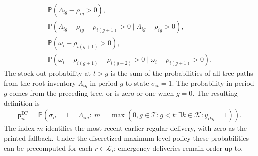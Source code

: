\documentclass[10pt]{article}
\begin{document}
\begin{gather*}
\mathbb P(\Lambda_{ig}-\rho_{ig}>0),\\
\mathbb P(\Lambda_{ig}-\rho_{ig}-\rho_{i(g+1)}>0\mid\Lambda_{ig}-\rho_{ig}>0),\\
\mathbb P(\omega_i-\rho_{i(g+1)}>0),\\
\mathbb P(\omega_i-\rho_{i(g+1)}-\rho_{i(g+2)}>0\mid\omega_i-\rho_{i(g+1)}>0).
\end{gather*}
The stock-out probability at $t>g$ is the sum of the probabilities of all tree paths from the root inventory $\Lambda_{ig}$ in period $g$ to state $\sigma_{it}=1$. The probability in period $g$ comes from the preceding tree, or is zero or one when $g=0$. The resulting definition is
\begin{equation}
\mathsf p^{\mathrm{DP}}_{it}
=\mathbb P\left(\sigma_{it}=1\ \middle|\ \Lambda_{im}:\ m=\max(0,g\in\mathcal T:g<t:\exists k\in\mathcal K:y_{ikg}=1)\right).
\tag{7}
\end{equation}
The index $m$ identifies the most recent earlier regular delivery, with zero as the printed fallback. Under the discretized maximum-level policy these probabilities can be precomputed for each $r\in\mathcal L_i$; emergency deliveries remain order-up-to.
\end{document}
